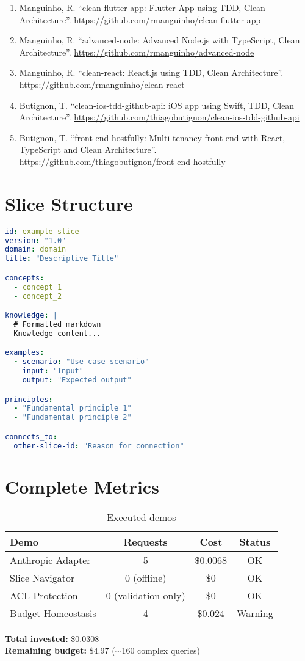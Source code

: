 \documentclass[11pt]{article}
\begin{document}
\begin{enumerate}
    \item Manguinho, R. ``clean-flutter-app: Flutter App using TDD, Clean Architecture''. \url{https://github.com/rmanguinho/clean-flutter-app}
    \item Manguinho, R. ``advanced-node: Advanced Node.js with TypeScript, Clean Architecture''. \url{https://github.com/rmanguinho/advanced-node}
    \item Manguinho, R. ``clean-react: React.js using TDD, Clean Architecture''. \url{https://github.com/rmanguinho/clean-react}
    \item Butignon, T. ``clean-ios-tdd-github-api: iOS app using Swift, TDD, Clean Architecture''. \url{https://github.com/thiagobutignon/clean-ios-tdd-github-api}
    \item Butignon, T. ``front-end-hostfully: Multi-tenancy front-end with React, TypeScript and Clean Architecture''. \url{https://github.com/thiagobutignon/front-end-hostfully}
\end{enumerate}

\appendix

\section{Slice Structure}

\begin{lstlisting}[language=yaml]
id: example-slice
version: "1.0"
domain: domain
title: "Descriptive Title"

concepts:
  - concept_1
  - concept_2

knowledge: |
  # Formatted markdown
  Knowledge content...

examples:
  - scenario: "Use case scenario"
    input: "Input"
    output: "Expected output"

principles:
  - "Fundamental principle 1"
  - "Fundamental principle 2"

connects_to:
  other-slice-id: "Reason for connection"
\end{lstlisting}

\section{Complete Metrics}

\begin{table}[H]
\centering
\begin{tabular}{@{}lccc@{}}
\toprule
\textbf{Demo} & \textbf{Requests} & \textbf{Cost} & \textbf{Status} \\ \midrule
Anthropic Adapter & 5 & \$0.0068 & OK \\
Slice Navigator & 0 (offline) & \$0 & OK \\
ACL Protection & 0 (validation only) & \$0 & OK \\
Budget Homeostasis & 4 & \$0.024 & Warning \\ \bottomrule
\end{tabular}
\caption{Executed demos}
\end{table}

\textbf{Total invested:} \$0.0308\\
\textbf{Remaining budget:} \$4.97 ($\sim$160 complex queries)
\end{document}
